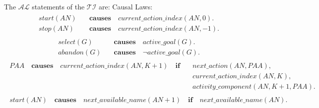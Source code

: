 \documentclass[11pt, oneside]{article}
\begin{document}
The $\mathcal{AL}$ statements of the $\mathcal{TI}$ are:\newline
Causal Laws:
\begin{align}\begin{split}
 start(AN)\quad &\mathbf{causes} \quad current\_action\_index(AN, 0). \\
 stop(AN)\quad &\mathbf{causes} \quad current\_action\_index(AN, -1). 
\end{split}\end{align}
\begin{align}\begin{split}
select(G)\quad &\mathbf{causes} \quad active\_goal(G). \\
abandon(G)\quad &\mathbf{causes} \quad \neg active\_goal(G). 
\end{split}\end{align}
\begin{align}\begin{split}
PAA\quad \mathbf{causes} \quad current\_action\_index(AN, K+1)\quad \mathbf{if}\quad &next\_action(AN, PAA), \\
&current\_action\_index(AN, K),\\
&activity\_component(AN, K+1, PAA).
\end{split}\end{align}
\begin{align}\begin{split}
start(AN) \quad \mathbf{causes} \quad next\_available\_name(AN+1) \quad \mathbf{if}\quad next\_available\_name(AN). 
\end{split}\end{align}
\end{document}
